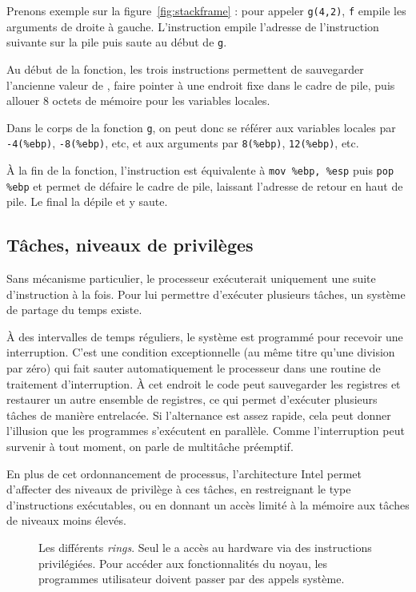 Prenons exemple sur la figure~\ref{fig:stackframe} : pour appeler
\texttt{g(4,2)}, \texttt{f} empile les arguments de droite à gauche.
L'instruction  empile l'adresse de l'instruction suivante sur
la pile puis saute au début de \texttt{g}.

Au début de la fonction, les trois instructions permettent de sauvegarder
l'ancienne valeur de \ebp, faire pointer \ebp à une endroit fixe dans le cadre
de pile, puis allouer 8 octets de mémoire pour les variables locales.

Dans le corps de la fonction \texttt{g}, on peut donc se référer aux variables
locales par \texttt{-4(\%ebp)}, \texttt{-8(\%ebp)}, etc, et aux arguments par
  \texttt{8(\%ebp)}, \texttt{12(\%ebp)}, etc.

À la fin de la fonction, l'instruction  est équivalente à
\texttt{mov \%ebp, \%esp} puis \texttt{pop \%ebp} et permet de défaire le cadre
de pile, laissant l'adresse de retour en haut de pile. Le  final
la dépile et y saute.

\subsection{Tâches, niveaux de privilèges}
\label{sec:taches}

Sans mécanisme particulier, le processeur exécuterait uniquement une suite
d'instruction à la fois. Pour lui permettre d'exécuter plusieurs tâches, un
système de partage du temps existe.

À des intervalles de temps réguliers, le système est programmé pour recevoir une
interruption. C'est une condition exceptionnelle (au même titre qu'une division
par zéro) qui fait sauter automatiquement le processeur dans une routine de
traitement d'interruption. À cet endroit le code peut sauvegarder les registres
et restaurer un autre ensemble de registres, ce qui permet d'exécuter plusieurs
tâches de manière entrelacée. Si l'alternance est assez rapide, cela peut donner
l'illusion que les programmes s'exécutent en parallèle. Comme l'interruption
peut survenir à tout moment, on parle de multitâche préemptif.

En plus de cet ordonnancement de processus, l'architecture Intel permet
d'affecter des niveaux de privilège à ces tâches, en restreignant le type
d'instructions exécutables, ou en donnant un accès limité à la mémoire aux
tâches de niveaux moins élevés.

\begin{figure}

\caption[Les différents \emph{rings}]{
  Les différents \emph{rings}. Seul le  a accès au hardware
  via des instructions privilégiées. Pour accéder aux fonctionnalités du noyau,
  les programmes utilisateur doivent passer par des appels système.}
\label{fig:rings}
\end{figure}

